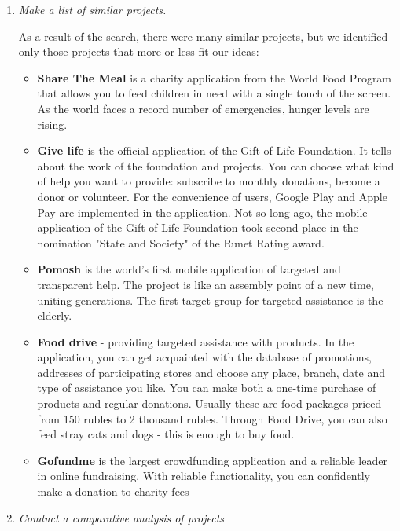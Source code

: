 \begin{enumerate}
    \item \textit{Make a list of similar projects.} 
    
        As a result of the search, there were many similar projects, but we identified only those projects that more or less fit our ideas:
        \begin{itemize}
            \item \textbf{Share The Meal} is a charity application from the World Food Program that allows you to feed children in need with a single touch of the screen. As the world faces a record number of emergencies, hunger levels are rising.
            \item \textbf{Give life} is the official application of the Gift of Life Foundation. It tells about the work of the foundation and projects. You can choose what kind of help you want to provide: subscribe to monthly donations, become a donor or volunteer. For the convenience of users, Google Play and Apple Pay are implemented in the application. Not so long ago, the mobile application of the Gift of Life Foundation took second place in the nomination "State and Society" of the Runet Rating award.
            \item \textbf{Pomosh} is the world's first mobile application of targeted and transparent help. The project is like an assembly point of a new time, uniting generations. The first target group for targeted assistance is the elderly.
            \item \textbf{Food drive} - providing targeted assistance with products. In the application, you can get acquainted with the database of promotions, addresses of participating stores and choose any place, branch, date and type of assistance you like. You can make both a one-time purchase of products and regular donations. Usually these are food packages priced from 150 rubles to 2 thousand rubles. Through Food Drive, you can also feed stray cats and dogs - this is enough to buy food.
            \item \textbf{Gofundme} is the largest crowdfunding application and a reliable leader in online fundraising. With reliable functionality, you can confidently make a donation to charity fees
        \end{itemize}
        
        
    
    \item \textit{Conduct a comparative analysis of projects} 
    

\end{enumerate}

